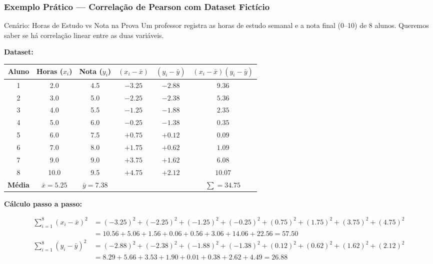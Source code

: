 \documentclass[12pt,a4paper]{article}
\begin{document}
\subsubsection*{Exemplo Prático --- Correlação de Pearson com Dataset Fictício}

\begin{exemplobox}{Cenário: Horas de Estudo vs Nota na Prova}
Um professor registra as horas de estudo semanal e a nota final (0--10) de 8 alunos. Queremos saber se há correlação linear entre as duas variáveis.
\end{exemplobox}

\textbf{Dataset:}

\begin{center}
\begin{tabular}{cccccc}
\toprule
Aluno & Horas ($x_i$) & Nota ($y_i$) & $(x_i - \bar{x})$ & $(y_i - \bar{y})$ & $(x_i-\bar{x})(y_i-\bar{y})$ \\
\midrule
1 & 2{.}0 & 4{.}5 & $-3{.}25$ & $-2{.}88$ & $9{.}36$ \\
2 & 3{.}0 & 5{.}0 & $-2{.}25$ & $-2{.}38$ & $5{.}36$ \\
3 & 4{.}0 & 5{.}5 & $-1{.}25$ & $-1{.}88$ & $2{.}35$ \\
4 & 5{.}0 & 6{.}0 & $-0{.}25$ & $-1{.}38$ & $0{.}35$ \\
5 & 6{.}0 & 7{.}5 & $+0{.}75$ & $+0{.}12$ & $0{.}09$ \\
6 & 7{.}0 & 8{.}0 & $+1{.}75$ & $+0{.}62$ & $1{.}09$ \\
7 & 9{.}0 & 9{.}0 & $+3{.}75$ & $+1{.}62$ & $6{.}08$ \\
8 & 10{.}0 & 9{.}5 & $+4{.}75$ & $+2{.}12$ & $10{.}07$ \\
\midrule
\textbf{Média} & $\bar{x}=5{.}25$ & $\bar{y}=7{.}38$ & & & $\sum = 34{.}75$ \\
\bottomrule
\end{tabular}
\end{center}

\textbf{Cálculo passo a passo:}

\begin{align*}
  \sum_{i=1}^{8}(x_i-\bar{x})^2
    &= (-3{.}25)^2+(-2{.}25)^2+(-1{.}25)^2+(-0{.}25)^2+(0{.}75)^2+(1{.}75)^2+(3{.}75)^2+(4{.}75)^2\\
    &= 10{.}56+5{.}06+1{.}56+0{.}06+0{.}56+3{.}06+14{.}06+22{.}56 = 57{.}50 \\[6pt]
  \sum_{i=1}^{8}(y_i-\bar{y})^2
    &= (-2{.}88)^2+(-2{.}38)^2+(-1{.}88)^2+(-1{.}38)^2+(0{.}12)^2+(0{.}62)^2+(1{.}62)^2+(2{.}12)^2\\
    &= 8{.}29+5{.}66+3{.}53+1{.}90+0{.}01+0{.}38+2{.}62+4{.}49 = 26{.}88
\end{align*}
\end{document}
